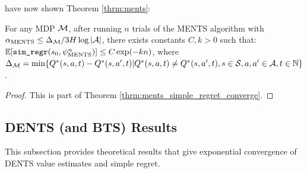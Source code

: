          have now shown Theorem \ref{thrm:ments}:
        \begin{customthm}{3.2} 
            For any MDP $\mathcal{M}$, after running $n$ trials of the MENTS algorithm with ${\alpha_{{\textnormal{MENTS}}}} \leq \Delta_{\mathcal{M}}/3H\log|\mathcal{A}|$,  there exists constants $C,k>0$ such that: $\mathbb{E}[{\textnormal{\texttt{sim\_regr}}}(s_0,\psi^n_{\textnormal{MENTS}})] \leq C\exp(-kn)$, where $\Delta_{\mathcal{M}}=\min \{Q^*(s,a,t)-Q^*(s,a',t)\vert Q^*(s,a,t) \neq Q^*(s,a',t),s\in\mathcal{S}, a,a'\in\mathcal{A},t\in\mathbb{N}\}$.
        \end{customthm}
        \begin{proof}
            This is part of Theorem \ref{thrm:ments_simple_regret_converge}.
        \end{proof}






    \subsection{DENTS (and BTS) Results} 
    \label{appsec:dents_proofs}


        This subsection provides theoretical results that give exponential convergence of DENTS value estimates and simple regret.  







